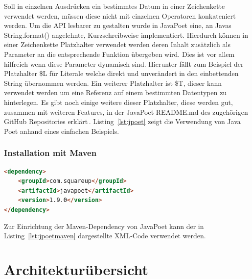 \documentclass[12pt,oneside,a4paper,parskip]{scrbook}
\begin{document}
Soll in einzelnen Ausdrücken ein bestimmtes Datum in einer Zeichenkette verwendet werden, müssen diese nicht mit einzelnen Operatoren konkateniert werden. Um die API lesbarer zu gestalten wurde in JavaPoet eine, an Javas String.format() angelehnte, Kurzschreibweise implementiert. Hierdurch können in einer Zeichenkette Platzhalter verwendet werden deren Inhalt zusätzlich als Parameter an die entsprechende Funktion übergeben wird. Dies ist vor allem hilfreich wenn diese Parameter dynamisch sind. Hierunter fällt zum Beispiel der Platzhalter \$L für Literale welche direkt und unverändert in den einbettenden String übernommen werden. Ein weiterer Platzhalter ist \$T, dieser kann verwendet werden um eine Referenz auf einem bestimmten Datentypen zu hinterlegen. Es gibt noch einige weitere dieser Platzhalter, diese werden gut, zusammen mit weiteren Features, in der JavaPoet README.md des zugehörigen GitHub Repositories erklärt\,\cite{javapoet2017}. Listing~\ref{lst:jpoet} zeigt die Verwendung von Java Poet anhand eines einfachen Beispiels.

\subsubsection{Installation mit Maven}

\begin{lstlisting}[label=lst:jpoetmaven,
language=HTML,
firstnumber=1,
caption=XML-Code zum Einbinden von JavaPoet als Maven-Dependency]
<dependency>
	<groupId>com.squareup</groupId>
	<artifactId>javapoet</artifactId>
	<version>1.9.0</version>
</dependency>
\end{lstlisting}

Zur Einrichtung der Maven-Dependency von JavaPoet kann der in Listing~\ref{lst:jpoetmaven} dargestellte XML-Code verwendet werden. 

\section{Architekturübersicht}
\end{document}
